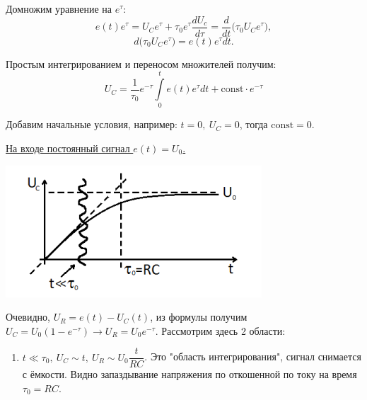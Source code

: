 \documentclass[../main/main.tex]{subfiles}
\begin{document}
Домножим уравнение на $e^\tau$:
$$e(t) e^\tau = U_C e^\tau + \tau_0 e^\tau \dfrac{dU_c}{d\tau} = \dfrac{d}{dt}\bigg( \tau_0 U_C e^\tau \bigg),$$
$$d \bigg( \tau_0 U_C e^\tau \bigg) = e(t) e^\tau dt.$$

Простым интегрированием и переносом множителей получим: 
$$U_C = \frac{1}{\tau_0} e^{-\tau} \displaystyle \int\limits_0^t e(t) e^{\tau} dt +  \text{const} \cdot e^{-\tau}$$

Добавим начальные условия, например: $t = 0,~U_C = 0$, тогда $\text{const} = 0$.

\underline{На входе постоянный сигнал $e(t) = U_0$.}

\begin{minipage}{6cm}
\centering %
\includegraphics[scale=0.6]{../section01/images/U_C_plot/U_C_plot.png} %
\end{minipage} \hfill   
\begin{minipage}{9cm}
Очевидно, $U_R = e(t) - U_C(t)$, из формулы получим $U_C = U_0 (1 - e^{-\tau}) \rightarrow U_R = U_0 e^{-\tau}$. Рассмотрим здесь 2 области: 

\begin{enumerate}
\item $t \ll \tau_0,~U_C \sim t,~U_R \sim U_0 \dfrac{t}{RC}$. Это "область интегрирования", сигнал снимается с ёмкости. Видно запаздывание напряжения по откошенной по току на время $\tau_0 = RC$.
\end{enumerate}
\end{minipage}
\end{document}
